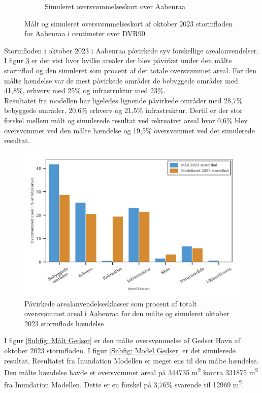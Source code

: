 \begin{figure}[H]
\begin{subfigure}[t]{0.5\textwidth}
        \caption{Simuleret oversvømmelseskort over Aabenraa}
        \label{Subfig: Model Aabenraa}
    \end{subfigure}
    \caption{Målt og simuleret oversvømmelseskort af oktober 2023 stormfloden for Aabenraa i centimeter over DVR90}
    \label{Figur: Målt & simuleret Aabenraa}
\end{figure}

Stormfloden i oktober 2023 i Aabenraa påvirkede syv forskellige arealanvendelser. I figur \ref{Figur: Påvirket arealanvendelse Aabenraa} er der vist hvor hvilke arealer der blev påvirket under den målte stormflod og den simuleret som procent af det totale oversvømmet areal. For den målte hændelse var de mest påvirkede områder de bebyggede områder med 41,8\%, erhverv med 25\% og infrastruktur med 23\%. \\
Resultatet fra modellen har ligeledes lignende påvirkede områder med 28,7\% bebyggede områder, 20,6\% erhverv og 21,5\% infrastruktur. Dertil er der stor forskel mellem målt og simulerede resultat ved rekreativt areal hvor 0,6\% blev oversvømmet ved den målte hændelse og 19,5\% oversvømmet ved det simulerede resultat. 

\begin{figure}[H]
    \centering
    \includegraphics[width=0.8\linewidth]{images/Resultater/areal_anvendelses_grafer/aabenraa_arealanvendelse.jpg}
    \caption{Påvirkede arealanvendelsesklasser som procent af totalt oversvømmet areal i Aabenraa for den målte og simuleret oktober 2023 stormflods hændelse}
    \label{Figur: Påvirket arealanvendelse Aabenraa}
\end{figure}

I figur \ref{Subfig: Målt Gedser} er den målte oversvømmelse af Gedser Havn af oktober 2023 stormfloden. I figur \ref{Subfig: Model Gedser} er det simulerede resultat. Resultatet fra Inundation Modellen er meget ens til den målte hændelse. Den målte hændelse havde et oversvømmet areal på 344735 m\textsuperscript{2} kontra 331875 m\textsuperscript{2} fra Inundation Modellen. Dette er en forskel på 3,76\% svarende til 12969 m\textsuperscript{2}.  

